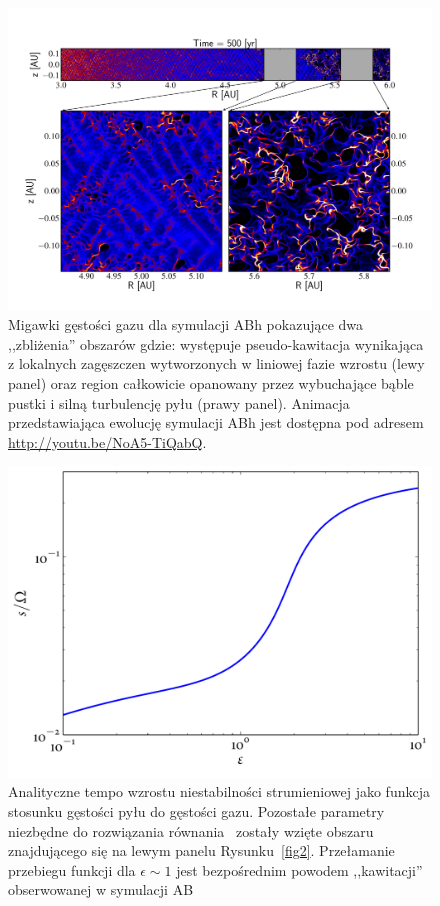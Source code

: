 \begin{figure} 
\centering
\includegraphics[width=0.98\linewidth]{figures/fig3}
\caption{Migawki gęstości gazu dla symulacji ABh pokazujące dwa ,,zbliżenia''
   obszarów gdzie: występuje pseudo-kawitacja wynikająca z lokalnych zagęszczen
   wytworzonych w liniowej fazie wzrostu (lewy panel) oraz region całkowicie
   opanowany przez wybuchające bąble pustki i silną turbulencję pyłu (prawy
   panel). Animacja przedstawiająca ewolucję symulacji ABh jest dostępna pod
   adresem \href{http://youtu.be/NoA5-TiQabQ}{http://youtu.be/NoA5-TiQabQ}.}
\label{fig3}
\end{figure}

\begin{figure}
   \centering
   \includegraphics[width=0.5\linewidth]{figures/growthAB}
   \caption{Analityczne tempo wzrostu niestabilności strumieniowej jako funkcja
      stosunku gęstości pyłu do gęstości gazu. Pozostałe parametry niezbędne do
      rozwiązania równania~ zostały wzięte obszaru znajdującego
      się na lewym panelu Rysunku~\ref{fig2}. Przełamanie przebiegu funkcji dla
      $\epsilon\sim 1$ jest bezpośrednim powodem ,,kawitacji'' obserwowanej w
      symulacji AB}
   \label{fig2b}
\end{figure}


